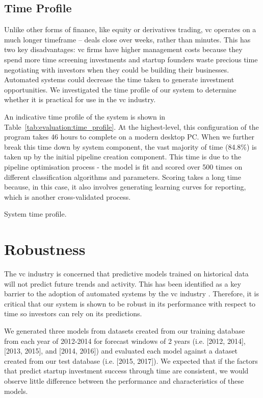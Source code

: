 \documentclass[../thesis/thesis.tex]{subfiles}
\begin{document}
\subsection{Time Profile}

Unlike other forms of finance, like equity or derivatives trading, \gls{vc} operates on a much longer timeframe -- deals close over weeks, rather than minutes. This has two key disadvantages: \gls{vc} firms have higher management costs because they spend more time screening investments and startup founders waste precious time negotiating with investors when they could be building their businesses. Automated systems could decrease the time taken to generate investment opportunities. We investigated the time profile of our system to determine whether it is practical for use in the \gls{vc} industry.

An indicative time profile of the system is shown in Table~\ref{tab:evaluation:time_profile}. At the highest-level, this configuration of the program takes 46 hours to complete on a modern desktop PC. When we further break this time down by system component, the vast majority of time (84.8\%) is taken up by the initial pipeline creation component. This time is due to the pipeline optimisation process - the model is fit and scored over 500 times on different classification algorithms and parameters. Scoring takes a long time because, in this case, it also involves generating learning curves for reporting, which is another cross-validated process.

\begin{table}[!htb]
    \centering
    \scalebox{0.9}{}
    \caption[System time profile]{System time profile.}
    \label{tab:evaluation:time_profile}
\end{table}

\section{Robustness}

The \gls{vc} industry is concerned that predictive models trained on historical data will not predict future trends and activity. This  has been identified as a key barrier to the adoption of automated systems by the \gls{vc} industry \cite{stone2014}. Therefore, it is critical that our system is shown to be robust in its performance with respect to time so investors can rely on its predictions.

We generated three models from datasets created from our training database from each year of 2012-2014 for forecast windows of 2 years (i.e. [2012, 2014], [2013, 2015], and [2014, 2016]) and evaluated each model against a dataset created from our test database (i.e. [2015, 2017]). We expected that if the factors that predict startup investment success through time are consistent, we would observe little difference between the performance and characteristics of these models.
\end{document}
